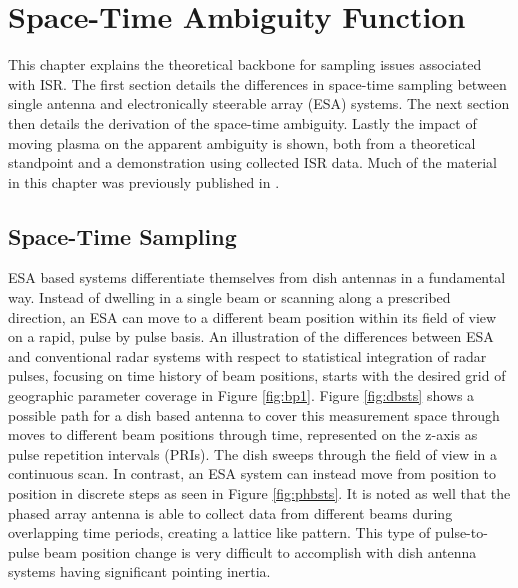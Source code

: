\chapter{Space-Time Ambiguity Function}
\label{chapter:stamb}
\thispagestyle{myheadings}

\graphicspath{{3_STAmb/Figures/}}

This chapter explains the theoretical backbone for sampling issues associated with ISR. The first section details the differences in space-time sampling between single antenna and electronically steerable array (ESA) systems. The next section then details the derivation of the space-time ambiguity. Lastly the impact of moving plasma on the apparent ambiguity is shown, both from a theoretical standpoint and a demonstration using collected ISR data. Much of the material in this chapter was previously published in \citet{RDS:RDS20236}.


\section{Space-Time Sampling}
\label{sec:sptimesamp}
ESA based systems differentiate themselves from dish antennas in a fundamental way. Instead of dwelling in a single beam or scanning along a prescribed direction, an ESA can move to a different beam position within its field of view on a rapid, pulse by pulse basis. An illustration of the differences between ESA and conventional radar systems with respect to statistical integration of radar pulses, focusing on time history of beam positions, starts with the desired grid of geographic parameter coverage in Figure \ref{fig:bp1}. Figure \ref{fig:dbsts} shows a possible path for a dish based antenna to cover this measurement space through moves to different beam positions through time, represented on the z-axis as pulse repetition intervals (PRIs). The dish sweeps through the field of view in a continuous scan.  In contrast, an ESA system can instead move from position to position in discrete steps as seen in Figure \ref{fig:phbsts}. It is noted as well that the phased array antenna is able to collect data from different beams during overlapping time periods, creating a lattice like pattern. This type of pulse-to-pulse beam position change is very difficult to accomplish with dish antenna systems having significant pointing inertia. 

